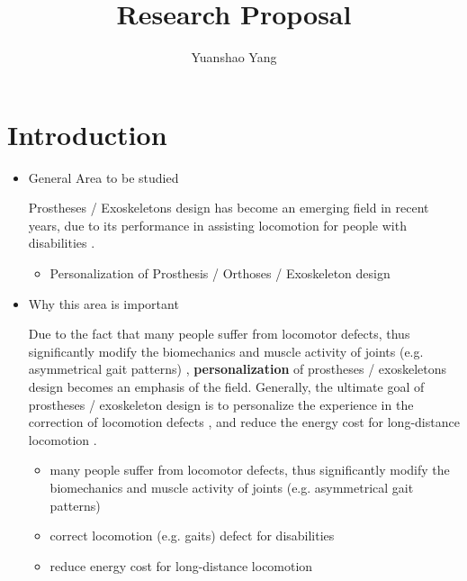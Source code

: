 \documentclass{article}
\title{Research Proposal}
\author{Yuanshao Yang}
\affil{Department of Mechanical Engineering, Univereity of Michigan}
\date{}
\begin{document}
\maketitle


\section{Introduction}
\begin{itemize}
    \item General Area to be studied
    
    Prostheses / Exoskeletons design has become an emerging field in recent years, due to its performance in assisting locomotion for people with disabilities \cite{PersonalizeMain}. 
    
    \begin{itemize}
        \item Personalization of Prosthesis / Orthoses / Exoskeleton design \cite{PersonalizeMain}
    \end{itemize}
    
    \item Why this area is important
    
    Due to the fact that many people suffer from locomotor defects, thus significantly modify the biomechanics and muscle activity of joints (e.g. asymmetrical gait patterns) \cite{GaitAdjustment}, \textbf{personalization} of prostheses / exoskeletons design becomes an emphasis of the field. Generally, the ultimate goal of prostheses / exoskeleton design is to personalize the experience in the correction of locomotion defects \cite{GaitCorrection}, and reduce the energy cost for long-distance locomotion \cite{ReduceEnergyCost}.

    \begin{itemize}
        \item many people suffer from locomotor defects, thus significantly modify the biomechanics and muscle activity of joints (e.g. asymmetrical gait patterns) \cite{GaitAdjustment}
        \item correct locomotion (e.g. gaits) defect for disabilities \cite{GaitCorrection}
        \item reduce energy cost for long-distance locomotion \cite{ReduceEnergyCost}
    \end{itemize}
\end{itemize}
\end{document}
